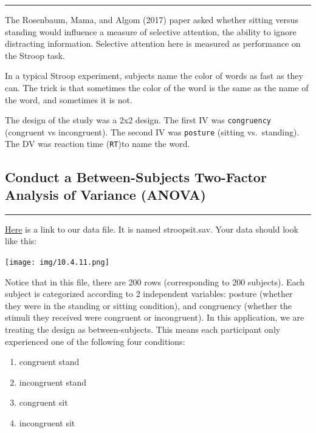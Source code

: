 \documentclass[]{book}
\providecommand{\tightlist}{%
  \setlength{\itemsep}{0pt}\setlength{\parskip}{0pt}}
\begin{document}
\begin{center}\rule{0.5\linewidth}{0.5pt}\end{center}

The Rosenbaum, Mama, and Algom (2017) paper asked whether sitting versus
standing would influence a measure of selective attention, the ability
to ignore distracting information. Selective attention here is measured
as performance on the Stroop task.

In a typical Stroop experiment, subjects name the color of words as fast
as they can. The trick is that sometimes the color of the word is the
same as the name of the word, and sometimes it is not.

The design of the study was a 2x2 design. The first IV was
\texttt{congruency} (congruent vs incongruent). The second IV was
\texttt{posture} (sitting vs.~standing). The DV was reaction time
(\texttt{RT})to name the word.

\subsection{Conduct a Between-Subjects Two-Factor Analysis of Variance
(ANOVA)}\label{conduct-a-between-subjects-two-factor-analysis-of-variance-anova}

\begin{center}\rule{0.5\linewidth}{0.5pt}\end{center}

\href{https://github.com/CrumpLab/statisticsLab/blob/master/data/spssdata/stroopsit.sav}{Here}
is a link to our data file. It is named stroopsit.sav. Your data should
look like this:

\texttt{[image: img/10.4.11.png]}

Notice that in this file, there are 200 rows (corresponding to 200
subjects). Each subject is categorized according to 2 independent
variables: posture (whether they were in the standing or sitting
condition), and congruency (whether the stimuli they received were
congruent or incongruent). In this application, we are treating the
design as between-subjects. This means each participant only experienced
one of the following four conditions:

\begin{enumerate}
\def\labelenumi{\arabic{enumi}.}
\tightlist
\item
  congruent stand
\item
  incongruent stand
\item
  congruent sit
\item
  incongruent sit
\end{enumerate}
\end{document}
